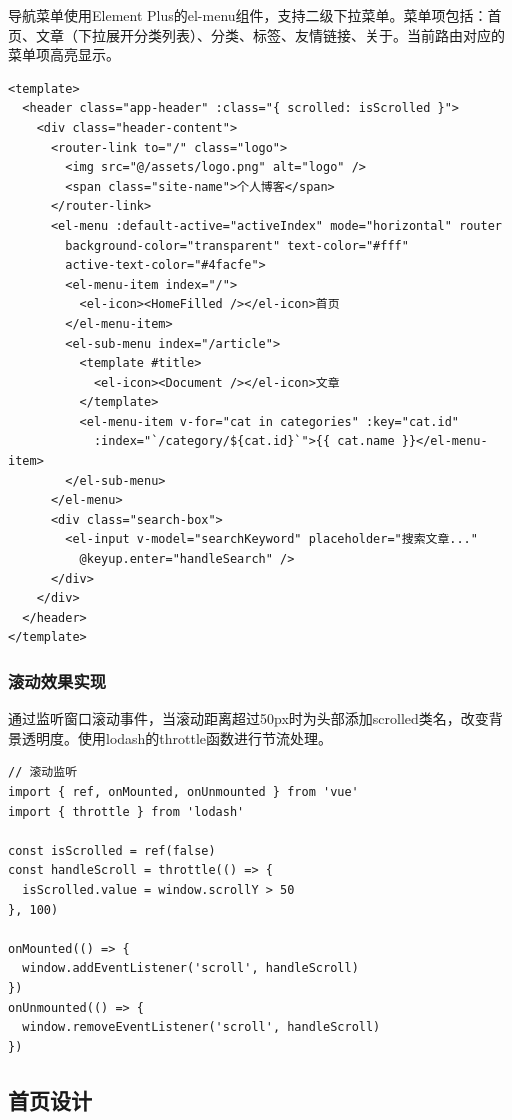 \documentclass[12pt,a4paper]{article}
\begin{document}
导航菜单使用Element Plus的el-menu组件，支持二级下拉菜单。菜单项包括：首页、文章（下拉展开分类列表）、分类、标签、友情链接、关于。当前路由对应的菜单项高亮显示。

\begin{lstlisting}[language={}, basicstyle=\ttfamily\small, caption=头部导航组件代码]
<template>
  <header class="app-header" :class="{ scrolled: isScrolled }">
    <div class="header-content">
      <router-link to="/" class="logo">
        <img src="@/assets/logo.png" alt="logo" />
        <span class="site-name">个人博客</span>
      </router-link>
      <el-menu :default-active="activeIndex" mode="horizontal" router
        background-color="transparent" text-color="#fff"
        active-text-color="#4facfe">
        <el-menu-item index="/">
          <el-icon><HomeFilled /></el-icon>首页
        </el-menu-item>
        <el-sub-menu index="/article">
          <template #title>
            <el-icon><Document /></el-icon>文章
          </template>
          <el-menu-item v-for="cat in categories" :key="cat.id"
            :index="`/category/${cat.id}`">{{ cat.name }}</el-menu-item>
        </el-sub-menu>
      </el-menu>
      <div class="search-box">
        <el-input v-model="searchKeyword" placeholder="搜索文章..."
          @keyup.enter="handleSearch" />
      </div>
    </div>
  </header>
</template>
\end{lstlisting}

\subsubsection{滚动效果实现}

通过监听窗口滚动事件，当滚动距离超过50px时为头部添加scrolled类名，改变背景透明度。使用lodash的throttle函数进行节流处理。

\begin{lstlisting}[language={}, caption=滚动监听代码]
// 滚动监听
import { ref, onMounted, onUnmounted } from 'vue'
import { throttle } from 'lodash'

const isScrolled = ref(false)
const handleScroll = throttle(() => {
  isScrolled.value = window.scrollY > 50
}, 100)

onMounted(() => {
  window.addEventListener('scroll', handleScroll)
})
onUnmounted(() => {
  window.removeEventListener('scroll', handleScroll)
})
\end{lstlisting}

\subsection{首页设计}
\end{document}
